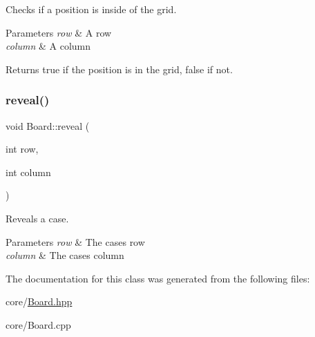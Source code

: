 Checks if a position is inside of the grid. 


\begin{DoxyParams}{Parameters}
{\em row} & A row \\
\hline
{\em column} & A column \\
\hline
\end{DoxyParams}
\begin{DoxyReturn}{Returns}
true if the position is in the grid, false if not. 
\end{DoxyReturn}
\mbox{\label{class_board_a4b0f58dcf0a552e80a9ca012e763d856}} 
\subsubsection{\texorpdfstring{reveal()}{reveal()}}
{\footnotesize\ttfamily void Board\+::reveal (\begin{DoxyParamCaption}\item[{int}]{row,  }\item[{int}]{column }\end{DoxyParamCaption})}



Reveals a case. 


\begin{DoxyParams}{Parameters}
{\em row} & The case\textquotesingle{}s row \\
\hline
{\em column} & The case\textquotesingle{}s column \\
\hline
\end{DoxyParams}


The documentation for this class was generated from the following files\+:\begin{DoxyCompactItemize}
\item 
core/\hyperlink{_board_8hpp}{Board.\+hpp}\item 
core/Board.\+cpp\end{DoxyCompactItemize}
